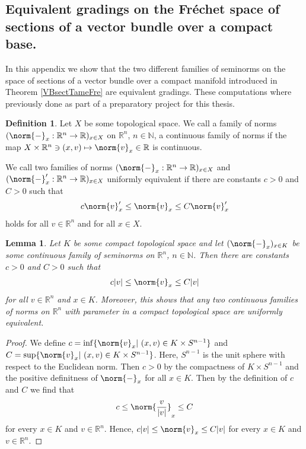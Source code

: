 \documentclass[12pt,a4paper]{article}
\theoremstyle{plain}
\newtheorem{lemma}[theorem]{Lemma}
\theoremstyle{definition}
\newtheorem{definition}[theorem]{Definition}
\newcommand{\R}{\mathbb{R}}
\newcommand{\N}{\mathbb{N}}
\newcommand{\nnorm}[2]{\norm{#1}_{#2}}
\begin{document}
 
\begin{appendices}

\section{Equivalent gradings on the Fréchet space of sections of a vector bundle over a compact base.}
\label{Appendix:EquivNormsOnGamma(V)}

In this appendix we show that the two different families of seminorms on the space of sections of a vector bundle over a compact manifold introduced in Theorem \ref{VBsectTameFre} are equivalent gradings. These computations where previously done as part of a preparatory project \cite{hausarbeit} for this thesis.

\begin{definition}
Let $X$ be some topological space. We call a family of norms $(\nnorm{-}{x}:\R^n\to \R)_{x\in X}$ on $\R^n$, $n\in \N$, a continuous family of norms if the map $X\times \R^n\ni (x,v)\mapsto \nnorm{v}{x}\in \R$ is continuous.

We call two families of norms $(\nnorm{-}{x}:\R^n\to \R)_{x\in X}$ and $(\nnorm{-}{x}':\R^n\to \R)_{x\in X}$ uniformly equivalent if there are constants $c>0$ and $C>0$ such that 
\begin{align*}
    c\nnorm{v}{x}'\leq \nnorm{v}{x}\leq C\nnorm{v}{x}'
\end{align*}
holds for all $v\in \R^n$ and for all $x\in X$.
\end{definition}


\begin{lemma}
\label{Lemma:ContFamOfNormUnifEquiv}
Let $K$ be some compact topological space and let $(\nnorm{-}{x})_{x\in K}$ be some continuous family of seminorms on $\R^n$, $n\in \N$. Then there are constants $c>0$ and $C>0$ such that 
\begin{align*}
    c|v|\leq \nnorm{v}{x} \leq C|v|
\end{align*}
for all $v\in \R^n$ and $x\in K$. Moreover, this shows that any two continuous families of norms on $\R^n$ with parameter in a compact topological space are uniformly equivalent.
\end{lemma}
\begin{proof}
We define $c=\inf \{\nnorm{v}{x}|~(x,v)\in K\times S^{n-1}\}$ and $C=\sup \{\nnorm{v}{x}|~(x,v)\in K\times S^{n-1}\}$. Here, $S^{n-1}$ is the unit sphere with respect to the Euclidean norm. Then $c>0$ by the compactness of $K\times S^{n-1}$ and the positive definitness of $\nnorm{-}{x}$ for all $x\in K$. Then by the definition of $c$ and $C$ we find that
\begin{align*}
    c\leq \nnorm{\frac{v}{|v|}}{x}\leq C
\end{align*} 
for every $x\in K$ and $v\in \R^n$.
Hence, $c|v|\leq \nnorm{v}{x}\leq C|v|$ for every $x\in K$ and $v\in \R^n$. 
\end{proof}


\end{appendices}
\end{document}
